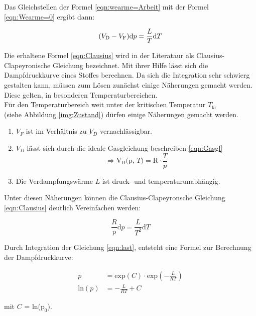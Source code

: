 \noindent  Das Gleichstellen der Formel \eqref{eqn:wearme=Arbeit} mit der Formel \eqref{eqn:Wearme=0} ergibt dann:

\begin{equation}
    (V_\text{D}-V_\text{F})\text{d}p =\frac{L}{T}\text{d}T\\
    \label{eqn:Clausius}
\end{equation}

\noindent Die erhaltene Formel \eqref{eqn:Clausius} wird in der Literataur als Clausius-Clapeyronische Gleichung bezeichnet. Mit ihrer Hilfe 
lässt sich die Dampfdruckkurve eines Stoffes berechnen. Da sich die Integration sehr schwierg gestalten kann, müssen zum Lösen
zunächst einige Näherungen gemacht werden. Diese gelten, in besonderen Temperaturbereichen.\\

\noindent Für den Temperaturbereich weit unter der kritischen Temperatur $T_\text{kr}$ \\ (siehe Abbildung \ref{img:Zustand}) dürfen einige 
Näherungen gemacht werden.
\begin{enumerate}
    \item $V_F$ ist im Verhältnis zu $V_D$ vernachlässigbar.
    \item $V_D$ lässt sich durch die ideale Gasgleichung beschreiben \eqref{eqn:Gasgl}\\
            \begin{equation}
                \Rightarrow \text{V}_\text{D} \text{(p, }T\text{)} = \text{R} \cdot \frac{T}{p} \nonumber
            \end{equation}
    \item Die Verdampfungswärme $L$ ist druck- und temperaturunabhängig.
\end{enumerate}

\noindent Unter diesen Näherungen können die Clausius-Clapeyronsche Gleichung \eqref{eqn:Clausius} deutlich Vereinfachen werden:

\begin{equation}
    \frac{R}{\text{p}}\text{d}p = \frac{L}{T^2}\text{d}T
    \label{eqn:last}
\end{equation}

\noindent Durch Integration der Gleichung \eqref{eqn:last}, entsteht eine Formel zur Berechnung der Dampfdruckkurve:

\begin{align}
p &= \text{exp}(C)\cdot \text{exp}\left(-\frac{L}{RT}\right) \nonumber\\
\text{ln}(p)&= -\frac{L}{RT} + C \label{eqn:steigung}
\end{align}

\noindent mit $C$ = ln($\text{p}_0$).
